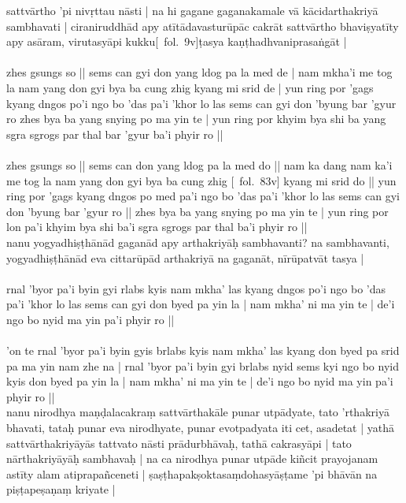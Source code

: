 \documentclass[12pt]{article}
\begin{document}
sattvārtho 'pi nivṛttau nāsti | na hi gagane gaganakamale vā kācidarthakriyā sambhavati | ciraniruddhād apy atītādavasturūpāc cakrāt sattvārtho bhaviṣyatīty apy asāram, virutasyāpi kukku[\MS\ fol.\ 9v]ṭasya kaṇṭhadhvaniprasaṅgāt |\\

\textbf{\TVA}\\
zhes gsungs so || sems can gyi don yang ldog pa la med de | nam mkha'i me tog la nam yang don gyi bya ba cung zhig kyang mi srid de | yun ring por 'gags kyang dngos po'i ngo bo 'das pa'i 'khor lo las sems can gyi don 'byung bar 'gyur ro zhes bya ba yang snying po ma yin te | yun ring por khyim bya shi ba yang sgra sgrogs par thal bar 'gyur ba'i phyir ro || \\

\textbf{\TVB}\\
zhes gsungs so || sems can don yang ldog pa la med do || nam ka dang nam ka'i me tog la nam yang don gyi bya ba cung zhig [\TVB\ fol.\ 83v] kyang mi srid do || yun ring por 'gags kyang dngos po med pa'i ngo bo 'das pa'i 'khor lo las sems can gyi don 'byung bar 'gyur ro || zhes bya ba yang snying po ma yin te | yun ring por lon pa'i khyim bya shi ba'i sgra sgrogs par thal ba'i phyir ro || \\

nanu yogyadhiṣṭhānād gaganād apy arthakriyāḥ sambhavanti? na sambhavanti, yogyadhiṣṭhānād eva cittarūpād arthakriyā na gaganāt, nīrūpatvāt tasya |\\

\textbf{\TVA}\\
rnal 'byor pa'i byin gyi rlabs kyis nam mkha' las kyang dngos po'i ngo bo 'das pa'i 'khor lo las sems can gyi don byed pa yin la | nam mkha' ni ma yin te | de'i ngo bo nyid ma yin pa'i phyir ro || \\

\textbf{\TVB}\\
'on te rnal 'byor pa'i byin gyis brlabs kyis nam mkha' las kyang don byed pa srid pa ma yin nam zhe na | rnal 'byor pa'i byin gyi brlabs nyid sems kyi ngo bo nyid kyis don byed pa yin la | nam mkha' ni ma yin te | de'i ngo bo nyid ma yin pa'i phyir ro || \\

nanu nirodhya maṇḍalacakraṃ sattvārthakāle punar utpādyate, tato 'rthakriyā bhavati, tataḥ punar eva nirodhyate, punar evotpadyata iti cet, asadetat | yathā sattvārthakriyāyās tattvato nāsti prādurbhāvaḥ, tathā cakrasyāpi | tato nārthakriyāyāḥ sambhavaḥ | na ca nirodhya punar utpāde kiñcit prayojanam astīty alam atiprapañceneti | ṣaṣṭhapakṣoktasaṃdohasyāṣṭame 'pi bhāvān na piṣṭapeṣaṇaṃ kriyate |\\
\end{document}
